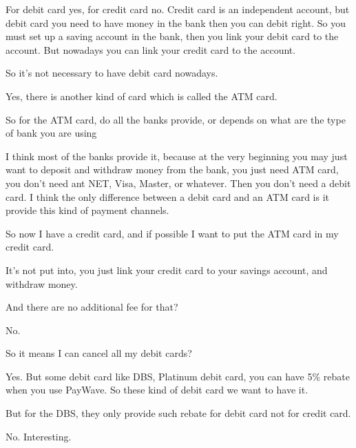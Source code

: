 \begin{description}[leftmargin=4em,style=nextline]
	\item[HJ:] For debit card yes, for credit card no. Credit card is an independent account, but debit card you need to have money in the bank then you can debit right. So you must set up a saving account in the bank, then you link your debit card to the account. But nowadays you can link your credit card to the account.

	\item[JH:] So it’s not necessary to have debit card nowadays.

	\item[HJ:] Yes, there is another kind of card which is called the ATM card.

	\item[JH:] So for the ATM card, do all the banks provide, or depends on what are the type of bank you are using

	\item[HJ:] I think most of the banks provide it, because at the very beginning you may just want to deposit and withdraw money from the bank, you just need ATM card, you don’t need ant NET, Visa, Master, or whatever. Then you don’t need a debit card. I think the only difference between a debit card and an ATM card is it provide this kind of payment channels.

	\item[JH:] So now I have a credit card, and if possible I want to put the ATM card in my credit card.

	\item[HJ:] It’s not put into, you just link your credit card to your savings account, and withdraw money.

	\item[JH:] And there are no additional fee for that?

	\item[HJ:] No.

	\item[JH:] So it means I can cancel all my debit cards?

	\item[HJ:] Yes. But some debit card like DBS, Platinum debit card, you can have 5\% rebate when you use PayWave. So these kind of debit card we want to have it.

	\item[JH:] But for the DBS, they only provide such rebate for debit card not for credit card.

	\item[HJ:] No. Interesting.


\end{description}
